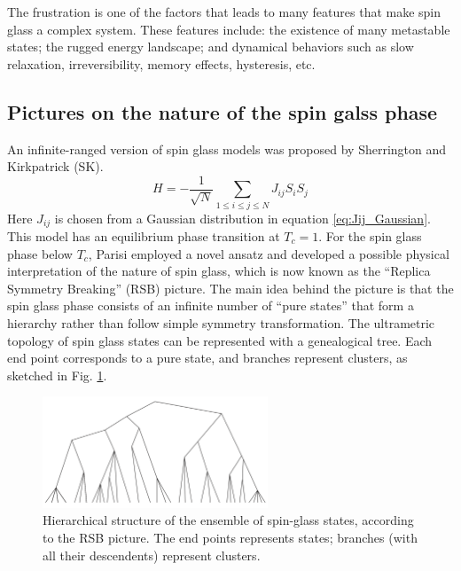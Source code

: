 The frustration is one of the factors that leads to many features that make 
spin glass a complex system.
These features include: the existence of many metastable states; the rugged energy 
landscape; and dynamical behaviors such as slow relaxation, irreversibility, 
memory effects, hysteresis, etc. 


\subsection{Pictures on the nature of the spin galss phase}
\label{sec:meanfield-model}

An infinite-ranged version of spin glass models 
was proposed by Sherrington and Kirkpatrick (SK).
\begin{equation}
  \label{eq:SK}
  H=-\frac{1}{\sqrt{N}}\sum_{1\le i\le j\le N}J_{ij}S_iS_j
\end{equation}
Here $J_{ij}$ is chosen from a Gaussian distribution in equation 
\ref{eq:Jij_Gaussian}.
This model has an equilibrium phase transition at $T_c = 1$.
For the spin glass phase below $T_c$, Parisi employed a novel ansatz and 
developed a  possible physical interpretation of the nature of spin glass, 
which is now known as the ``Replica Symmetry Breaking'' (RSB) picture. The main
idea behind the picture is that the spin glass phase consists of an infinite 
number of ``pure states'' that form a hierarchy rather than follow simple symmetry
transformation. 
The ultrametric topology of spin glass states can be represented with a 
genealogical tree. Each end point corresponds to a pure state, and branches 
represent clusters, as sketched in Fig. \ref{fig:TreeRSB}. 


\begin{figure}[!h]
  \label{fig:TreeRSB}
  \centering
  \includegraphics[width=0.6\textwidth]{img/TreeRSB.png}
  \caption{Hierarchical structure of the ensemble of spin-glass states, according
to the RSB picture. The end points represents states; branches (with all their descendents)
represent clusters.}
\end{figure}


